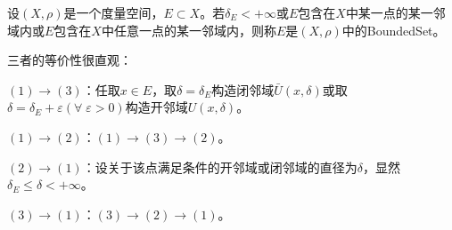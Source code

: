 \begin{definition}
	设$(X,\rho)$是一个度量空间，$E\subset X$。若$\delta_E<+\infty$或$E$包含在$X$中某一点的某一邻域内或$E$包含在$X$中任意一点的某一邻域内，则称$E$是$(X,\rho)$中的\gls{BoundedSet}。
\end{definition}
\begin{note}
	三者的等价性很直观：\par
	$(1)\to(3)$：任取$x\in E$，取$\delta=\delta_E$构造闭邻域$\bar{U}(x,\delta)$或取$\delta=\delta_E+\varepsilon(\forall\;\varepsilon>0)$构造开邻域$U(x,\delta)$。\par
	$(1)\to(2)$：$(1)\to(3)\to(2)$。\par
	$(2)\to(1)$：设关于该点满足条件的开邻域或闭邻域的直径为$\delta$，显然$\delta_E\leqslant\delta<+\infty$。\par 
	$(3)\to(1)$：$(3)\to(2)\to(1)$。
\end{note}


